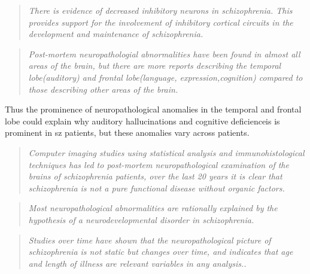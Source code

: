 \begin{quotation}
	\textit{There is evidence of decreased inhibitory neurons in schizophrenia. This provides support for the involvement of inhibitory cortical circuits in the development and maintenance of schizophrenia.}
	\begin{flushright}
		\cite{bakhshi2015neuropathology}
	\end{flushright}
\end{quotation}
\begin{quotation}
	\textit{Post-mortem neuropathologial abnormalities have been found in almost all areas of the brain, but there are more reports describing the temporal lobe(auditory) and frontal lobe(language, expression,cognition) compared to those describing other areas of the brain.}
	\begin{flushright}
		\cite{iritani2007neuropathology}
	\end{flushright}
\end{quotation}
Thus the prominence of neuropathological anomalies in the temporal and frontal lobe could explain why auditory hallucinations and cognitive deficienceis is prominent in \ac{sz} patients, but these anomalies vary across patients.
\begin{quotation}
	\textit{Computer imaging studies using statistical analysis and immunohistological techniques has led to post-mortem neuropathological examination of the brains of schizophrenia patients, over the last 20 years it is clear that schizophrenia is not a pure functional disease without organic factors.}
	\begin{flushright}
		\cite{iritani2007neuropathology}
	\end{flushright}
\end{quotation}
\begin{quotation}
	\textit{Most neuropathological abnormalities are rationally explained by the hypothesis of a neurodevelopmental disorder in schizophrenia.}
	\begin{flushright}
		\cite{iritani2007neuropathology}
	\end{flushright}
\end{quotation}
\begin{quotation}
	\textit{Studies over time have shown that the neuropathological picture of schizophrenia is not static but changes over time, and indicates that age and length of illness are relevant variables in any analysis..}
	\begin{flushright}
		\cite{bakhshi2015neuropathology}
	\end{flushright}
\end{quotation}
